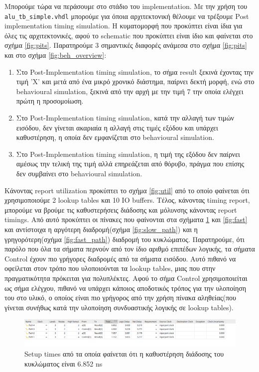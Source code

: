 \documentclass[11pt, a4paper]{report}
\begin{document}
Μπορούμε τώρα να περάσουμε στο στάδιο του implementation. Με την χρήση του \texttt{alu_tb_simple.vhdl} μπορούμε για όποια αρχιτεκτονική θέλουμε να τρέξουμε Post implementation timing simulation.
Η κυματομορφή που προκύπτει είναι ίδια για όλες τις αρχιτεκτονικές, αφού το schematic που προκύπτει είναι ίδιο και φαίνεται στο σχήμα \ref{fig:pits}. 
Παρατηρούμε 3 σημαντικές διαφορές ανάμεσα στο σχήμα \ref{fig:pits} και στο σχήμα \ref{fig:beh_overview}:
\begin{enumerate}
  \item Στο Post-Implementation timing simulation, το σήμα result ξεκινά έχοντας την τιμή 'X' και μετά από ένα μικρό χρονικό διάστημα, παίρνει δεκτή μορφή, ενώ στο behavioural simulation, ξεκινά από την αρχή με την τιμή 7 την οποία ελέγχει πρώτη η προσομοίωση.
  \item Στο Post-Implementation timing simulation, κατά την αλλαγή των τιμών εισόδου, δεν γίνεται ακαριαία η αλλαγή στις τιμές εξόδου και υπάρχει καθυστέρηση, η οποία δεν εμφανίζεται στο behavioural simulation.
  \item Στο Post-Implementation timing simulation, η τιμή της εξόδου δεν παίρνει αμέσως την τελική της τιμή αλλά επηρεάζεται από θόρυβο, πράγμα που επίσης δεν συμβαίνει στο behavioural simulation.
\end{enumerate}

Κάνοντας report utilization  προκύπτει το σχήμα \ref{fig:util} από το οποίο φαίνεται ότι χρησιμοποιούμε 2 lookup tables και 10 IO buffers.
Τέλος, κάνοντας timing report, μπορούμε να βρούμε τις καθυστερήσεις διάδοσης και μόλυνσης κάνοντας report timings.
Από αυτό προκύπτει οι πίνακες που φαίνονται στα σχήματα \ref{fig:slow} και \ref{fig:fast} και αντίστοιχα η αργότερη διαδρομή(σχήμα \ref{fig:slow_path}) και η γρηγορότερη(σχήμα \ref{fig:fast_path}) διαδρομή του κυκλώματος.
Παρατηρούμε, ότι παρόλο που όλα τα σήματα περνούν από τον ίδιο αριθμό επιπέδων λογικής, τα σήματα Control έχουν πιο γρήγορες διαδρομές από τα σήματα εισόδου.
Αυτό πιθανό να οφείλεται στον τρόπο που υλοποιούνται τα lookup tables, μιας που στην πραγματικότητα πρόκειται για πολυπλέκτες. Αφού το σήμα Control χρησιμοποιείται ως σήμα ελέγχου, πιθανό να υπάρχει κάποιος αποδοτικός τρόπος για την υλοποίηση του στο υλικό, ο οποίος είναι πιο γρήγορος από την χρήση πίνακα αληθείας(που γίνεται συνήθως κατά την υλοποίηση συνδυαστικής λογικής σε lookup tables).

\begin{figure}
  \includegraphics[width=\textwidth]{./images/alu-2/slow-report.png}
  \caption{Setup times από τα οποία φαίνεται ότι η καθυστέρηση διάδοσης του κυκλώματος είναι 6.852 ns}
  \label{fig:slow}
\end{figure}
\end{document}
